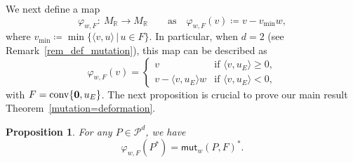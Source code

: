 \documentclass[11pt]{article}
\numberwithin{equation}{section}
\numberwithin{equation}{section}
\numberwithin{figure}{section}
\numberwithin{table}{section}
\newtheorem{Proposition}[Theorem]{Proposition}
 { \theoremstyle{definition}
\newtheorem{Definition}[Theorem]{Definition}
\newtheorem{Note}[Theorem]{Note}
\newtheorem{Example}[Theorem]{Example}
\newtheorem{Remark}[Theorem]{Remark}
\newtheorem{observation}[Theorem]{Observation}
\newtheorem{operation}[Theorem]{Operation}
\newtheorem{setting}[Theorem]{Setting}}
\newcommand{\RR}{\mathbb{R}}
\newcommand{\calP}{\mathcal{P}}
\newcommand{\mut}{\mathsf{mut}}
\begin{document}
We next define a map
\[
\varphi_{w,F}\colon \ M_\RR\rightarrow M_\RR \qquad \text{as} \quad \varphi_{w,F}(v)\coloneqq v-v_{\min}w,
\]
where \mbox{$v_{\min}\coloneqq {\min}\{\langle v, u\rangle\,|\, u\in F\}$}.
In particular, when $d=2$ (see Remark~\ref{rem_def_mutation}), this map can be described as
\begin{equation}\label{mutation_M}
\varphi_{w,F}(v)=
\begin{cases}
v & \text{if $\langle v,u_E\rangle\ge0$}, \\
v-\langle v,u_E\rangle w&\text{if $\langle v,u_E\rangle<0$},
\end{cases}
\end{equation}
with $F=\operatorname{conv}\{{\bf 0},u_E\}$.
The next proposition is crucial to prove our main result Theorem~\ref{mutation=deformation}.


\begin{Proposition}
\label{prop_mutation_dual_polytope}
For any $P \in \calP^d$, we have
\begin{displaymath}\varphi_{w,F}(P^*)=\mut_w(P,F)^*.
\end{displaymath}
\end{Proposition}
\end{document}

